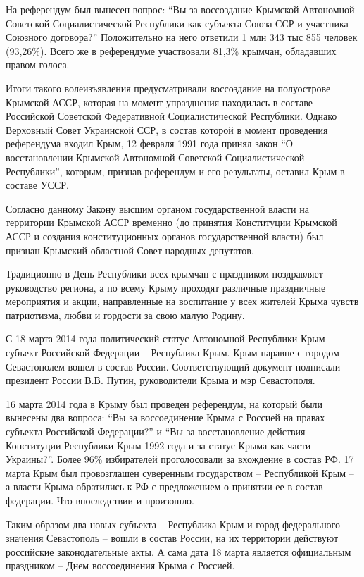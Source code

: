 На референдум был вынесен вопрос: \enquote{Вы за воссоздание Крымской Автономной
Советской Социалистической Республики как субъекта Союза ССР и участника
Союзного договора?} Положительно на него ответили 1 млн 343 тыс 855 человек
(93,26\%). Всего же в референдуме участвовали 81,3\% крымчан, обладавших правом
голоса.

Итоги такого волеизъявления предусматривали воссоздание на полуострове Крымской
АССР, которая на момент упразднения находилась в составе Российской Советской
Федеративной Социалистической Республики. Однако Верховный Совет Украинской
ССР, в состав которой в момент проведения референдума входил Крым, 12 февраля
1991 года принял закон \enquote{О восстановлении Крымской Автономной Советской
Социалистической Республики}, которым, признав референдум и его результаты,
оставил Крым в составе УССР.

Согласно данному Закону высшим органом государственной власти на территории
Крымской АССР временно (до принятия Конституции Крымской АССР и создания
конституционных органов государственной власти) был признан Крымский областной
Совет народных депутатов.

Традиционно в День Республики всех крымчан с праздником поздравляет руководство
региона, а по всему Крыму проходят различные праздничные мероприятия и акции,
направленные на воспитание у всех жителей Крыма чувств патриотизма, любви и
гордости за свою малую Родину.

С 18 марта 2014 года политический статус Автономной Республики Крым – субъект
Российской Федерации – Республика Крым. Крым наравне с городом Севастополем
вошел в состав России. Соответствующий документ подписали президент России В.В.
Путин, руководители Крыма и мэр Севастополя.

16 марта 2014 года в Крыму был проведен референдум, на который были вынесены
два вопроса: \enquote{Вы за воссоединение Крыма с Россией на правах субъекта Российской
Федерации?} и \enquote{Вы за восстановление действия Конституции Республики Крым 1992
года и за статус Крыма как части Украины?}. Более 96\% избирателей проголосовали
за вхождение в состав РФ. 17 марта Крым был провозглашен суверенным
государством – Республикой Крым – а власти Крыма обратились к РФ с предложением
о принятии ее в состав федерации. Что впоследствии и произошло.

Таким образом два новых субъекта – Республика Крым и город федерального
значения Севастополь – вошли в состав России, на их территории действуют
российские законодательные акты. А сама дата 18 марта является официальным
праздником – Днем воссоединения Крыма с Россией.
